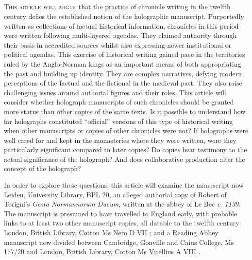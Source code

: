 \begin{paper}
\section*{} 
\textsc{This article will argue} that the practice of chronicle writing in the
twelfth century defies the established notion of the holographic
manuscript. Purportedly written as collections of factual historical
information, chronicles in this period were written following
multi-layered agendas. They claimed authority through their basis in
accredited sources whilst also expressing newer institutional or
political agendas. This exercise of historical writing gained pace in
the territories ruled by the Anglo-Norman kings as an important means of
both appropriating the past and building up identity. They are complex
narratives, defying modern perceptions of the factual and the fictional
in the medieval past. They also raise challenging issues around
authorial figures and their roles. This article will consider whether
holograph manuscripts of such chronicles should be granted more status
than other copies of the same texts. Is it possible to understand how
far holographs constituted ``official'' versions of this type of
historical writing when other manuscripts or copies of other chronicles
were not? If holographs were well cared for and kept in the monasteries
where they were written, were they particularly significant compared to
later copies? Do copies bear testimony to the actual significance of the
holograph? And does collaborative production alter the concept of the
holograph?

In order to explore these questions, this article will examine the
manuscript now Leiden, University Library, BPL 20, an alleged authorial
copy of Robert of Torigni's \emph{Gesta Normannorum Ducum}, written at
the abbey of Le Bec \emph{c. 1139}. The manuscript is presumed to have
travelled to England early, with probable links to at least two other
manuscript copies, all datable to the twelfth century: London, British
Library, Cotton Ms Nero D VII \citep[xcvi]{van_houts_gesta_1992}; and a Reading
Abbey manuscript now divided between Cambridge, Gonville and Caius
College, Ms 177/20 and London, British Library, Cotton Ms Vitellius A
VIII \citep[cxii]{van_houts_gesta_1992}.


\end{paper}
